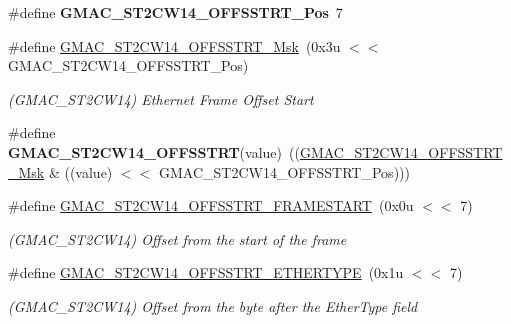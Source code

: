 \begin{DoxyCompactItemize}
\item 
\mbox{\label{group__SAMV71__GMAC_ga6a7f245b0bf2c2da4e99ffa02fd66655}} 
\#define {\bfseries G\+M\+A\+C\+\_\+\+S\+T2\+C\+W14\+\_\+\+O\+F\+F\+S\+S\+T\+R\+T\+\_\+\+Pos}~7
\item 
\mbox{\label{group__SAMV71__GMAC_ga7667912deb8761981013e0e703f09243}} 
\#define \mbox{\hyperlink{group__SAMV71__GMAC_ga7667912deb8761981013e0e703f09243}{G\+M\+A\+C\+\_\+\+S\+T2\+C\+W14\+\_\+\+O\+F\+F\+S\+S\+T\+R\+T\+\_\+\+Msk}}~(0x3u $<$$<$ G\+M\+A\+C\+\_\+\+S\+T2\+C\+W14\+\_\+\+O\+F\+F\+S\+S\+T\+R\+T\+\_\+\+Pos)
\begin{DoxyCompactList}\small\item\em (G\+M\+A\+C\+\_\+\+S\+T2\+C\+W14) Ethernet Frame Offset Start \end{DoxyCompactList}\item 
\mbox{\label{group__SAMV71__GMAC_ga4104d47c601f627816fa24b3a116f357}} 
\#define {\bfseries G\+M\+A\+C\+\_\+\+S\+T2\+C\+W14\+\_\+\+O\+F\+F\+S\+S\+T\+RT}(value)~((\mbox{\hyperlink{group__SAMV71__GMAC_ga7667912deb8761981013e0e703f09243}{G\+M\+A\+C\+\_\+\+S\+T2\+C\+W14\+\_\+\+O\+F\+F\+S\+S\+T\+R\+T\+\_\+\+Msk}} \& ((value) $<$$<$ G\+M\+A\+C\+\_\+\+S\+T2\+C\+W14\+\_\+\+O\+F\+F\+S\+S\+T\+R\+T\+\_\+\+Pos)))
\item 
\mbox{\label{group__SAMV71__GMAC_gaf93740a9905750a5f28eb0e63c7f4872}} 
\#define \mbox{\hyperlink{group__SAMV71__GMAC_gaf93740a9905750a5f28eb0e63c7f4872}{G\+M\+A\+C\+\_\+\+S\+T2\+C\+W14\+\_\+\+O\+F\+F\+S\+S\+T\+R\+T\+\_\+\+F\+R\+A\+M\+E\+S\+T\+A\+RT}}~(0x0u $<$$<$ 7)
\begin{DoxyCompactList}\small\item\em (G\+M\+A\+C\+\_\+\+S\+T2\+C\+W14) Offset from the start of the frame \end{DoxyCompactList}\item 
\mbox{\label{group__SAMV71__GMAC_gae7cff136a4c85bcc700c64853d16a14b}} 
\#define \mbox{\hyperlink{group__SAMV71__GMAC_gae7cff136a4c85bcc700c64853d16a14b}{G\+M\+A\+C\+\_\+\+S\+T2\+C\+W14\+\_\+\+O\+F\+F\+S\+S\+T\+R\+T\+\_\+\+E\+T\+H\+E\+R\+T\+Y\+PE}}~(0x1u $<$$<$ 7)
\begin{DoxyCompactList}\small\item\em (G\+M\+A\+C\+\_\+\+S\+T2\+C\+W14) Offset from the byte after the Ether\+Type field \end{DoxyCompactList}\item 

\end{DoxyCompactItemize}

